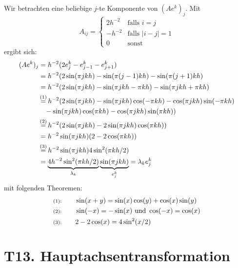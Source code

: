 \documentclass[11pt]{article}
\theoremstyle{plain}
\theoremstyle{definition}
\newcommand{\equalstar}{\mathop{=}\limits^{(1)}}
\newcommand{\equalsstar}{\mathop{=}\limits^{(2)}}
\newcommand{\equalssstar}{\mathop{=}\limits^{(3)}}
\begin{document}
Wir betrachten eine beliebige $j$-te Komponente von $(Ae^k)_j$. Mit
\begin{equation}
A_{ij} =
 \begin{cases}
   2h^{-2}  & \text{falls } i=j \\
   -h^{-2}  & \text{falls } |i-j|=1 \\
   0 & \text{sonst }
  \end{cases}
\end{equation}
ergibt sich:
\begin{align*}
(Ae^k)_j 
&= h^{-2} ( 2e^k_j - e^k_{j-1} - e^k_{j+1} ) \\
&= h^{-2} ( 2\sin(\pi jkh) - \sin(\pi (j-1)kh) - \sin(\pi (j+1)kh) \\
&= h^{-2} ( 2\sin(\pi jkh) - \sin(\pi jkh - \pi kh) - \sin(\pi jkh + \pi kh) \\
&\equalstar h^{-2} ( 2\sin(\pi jkh) - \sin(\pi jkh)\cos(- \pi kh) -\cos(\pi jkh)\sin(-\pi kh) \\ & \hspace{0.3cm}- \sin(\pi jkh)\cos(\pi kh) - \cos(\pi jkh)\sin(\pi kh)) \\
&\equalsstar h^{-2} ( 2\sin(\pi jkh) - 2\sin(\pi jkh)\cos(\pi kh)) \\
&= h^{-2}\sin(\pi jkh) ( 2 - 2\cos(\pi kh)) \\
&\equalssstar h^{-2}\sin(\pi jkh)  4\sin^2(\pi kh/2) \\ 
&= \underbrace{4h^{-2}\sin^2(\pi kh/2)}_{\lambda_k}\underbrace{\sin(\pi jkh)}_{e^k_j} = \lambda_k e^k_j
\end{align*}
mit folgenden Theoremen:
\begin{align*}
\text{\scriptsize{(1):}}& \qquad \sin(x+y) = \sin(x)\cos(y) + \cos(x)\sin(y) \\ 
\text{\scriptsize{(2):}}& \qquad \sin(-x) = -\sin(x) \text{ und } \cos(-x) = \cos(x)\\ 
\text{\scriptsize{(3):}}& \qquad 2-2\cos(x) = 4\sin^2(x/2) 
\end{align*}
\section*{T13. Hauptachsentransformation}
\end{document}
